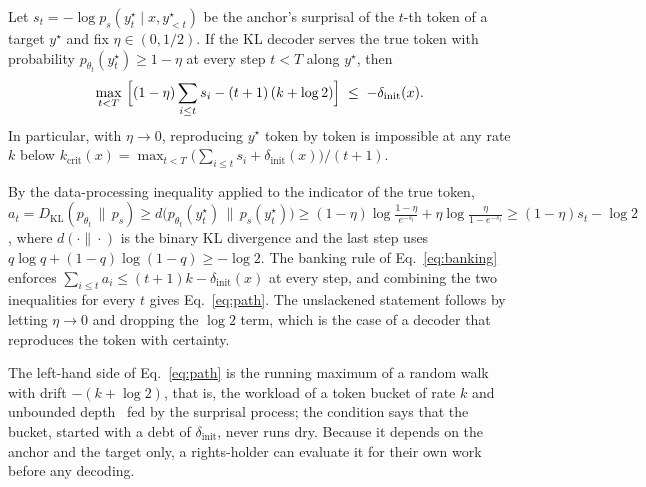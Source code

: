 \begin{proposition}\label{prop:path}
Let $s_t = -\log p_s(y^\star_t \mid x, y^\star_{<t})$ be the anchor's surprisal of the $t$-th token of a target $y^\star$ and fix $\eta \in (0, 1/2)$. If the KL decoder serves the true token with probability $p_{\theta_t}(y^\star_t) \ge 1 - \eta$ at every step $t < T$ along $y^\star$, then
\begin{equation}
\max_{t < T}\ \Bigl[(1-\eta) \sum_{i \le t} s_i - (t+1)\,(k + \log 2)\Bigr] \;\le\; -\delta_{\mathrm{init}}(x).
\label{eq:path}
\end{equation}
In particular, with $\eta \to 0$, reproducing $y^\star$ token by token is impossible at any rate $k$ below $k_{\mathrm{crit}}(x) = \max_{t<T} \bigl(\sum_{i \le t} s_i + \delta_{\mathrm{init}}(x)\bigr)/(t+1)$.
\end{proposition}
\begin{IEEEproof}
By the data-processing inequality applied to the indicator of the true token, $a_t = D_{\mathrm{KL}}(p_{\theta_t} \,\|\, p_s) \ge d\bigl(p_{\theta_t}(y^\star_t)\,\|\,p_s(y^\star_t)\bigr) \ge (1-\eta)\log\frac{1-\eta}{e^{-s_t}} + \eta \log\frac{\eta}{1 - e^{-s_t}} \ge (1-\eta) s_t - \log 2$, where $d(\cdot\|\cdot)$ is the binary KL divergence and the last step uses $q \log q + (1-q)\log(1-q) \ge -\log 2$. The banking rule of Eq.~\eqref{eq:banking} enforces $\sum_{i \le t} a_i \le (t+1)k - \delta_{\mathrm{init}}(x)$ at every step, and combining the two inequalities for every $t$ gives Eq.~\eqref{eq:path}. The unslackened statement follows by letting $\eta \to 0$ and dropping the $\log 2$ term, which is the case of a decoder that reproduces the token with certainty.
\end{IEEEproof}
The left-hand side of Eq.~\eqref{eq:path} is the running maximum of a random walk with drift $-(k + \log 2)$, that is, the workload of a token bucket of rate $k$ and unbounded depth~\cite{turner1986leaky} fed by the surprisal process; the condition says that the bucket, started with a debt of $\delta_{\mathrm{init}}$, never runs dry. Because it depends on the anchor and the target only, a rights-holder can evaluate it for their own work before any decoding.

